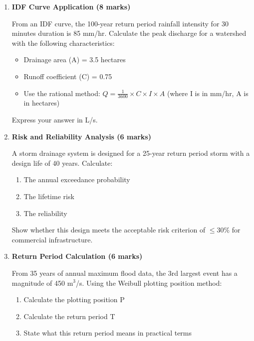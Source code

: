 \documentclass[11pt,a4paper]{article}
\begin{document}
\begin{enumerate}

\item \textbf{IDF Curve Application (8 marks)}

From an IDF curve, the 100-year return period rainfall intensity for 30 minutes duration is 85 mm/hr. Calculate the peak discharge for a watershed with the following characteristics:
\begin{itemize}[nosep]
    \item Drainage area (A) = 3.5 hectares
    \item Runoff coefficient (C) = 0.75
    \item Use the rational method: $Q = \frac{1}{3600} \times C \times I \times A$ (where I is in mm/hr, A is in hectares)
\end{itemize}

Express your answer in L/s.

\vspace{8cm}

\item \textbf{Risk and Reliability Analysis (6 marks)}

A storm drainage system is designed for a 25-year return period storm with a design life of 40 years. Calculate:
\begin{enumerate}[label=\alph*)]
    \item The annual exceedance probability
    \item The lifetime risk
    \item The reliability
\end{enumerate}

Show whether this design meets the acceptable risk criterion of $\leq 30\%$ for commercial infrastructure.

\vspace{8cm}

\item \textbf{Return Period Calculation (6 marks)}

From 35 years of annual maximum flood data, the 3rd largest event has a magnitude of 450 m$^3$/s. Using the Weibull plotting position method:
\begin{enumerate}[label=\alph*)]
    \item Calculate the plotting position P
    \item Calculate the return period T
    \item State what this return period means in practical terms
\end{enumerate}

\vspace{7cm}

\end{enumerate}
\end{document}

